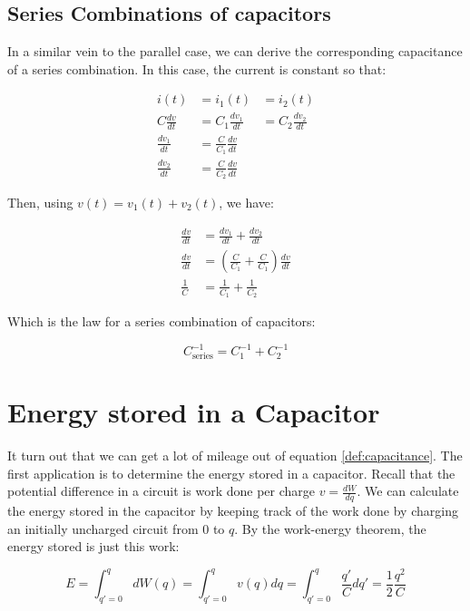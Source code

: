 \documentclass{tufte-book}
\begin{document}
\subsection{Series Combinations of capacitors}
In a similar vein to the parallel case, we can derive the corresponding capacitance of a series combination. In this case, the current is constant so that:

\begin{eqnarray*}
i(t)  &= i_1(t) &= i_2(t) \\
C\frac{dv}{dt}  &= C_1\frac{dv_1}{dt}             &= C_2\frac{dv_2}{dt} \\
\frac{dv_1}{dt} &= \frac{C}{C_1}\frac{dv}{dt}  & \\
\frac{dv_2}{dt} &= \frac{C}{C_2}\frac{dv}{dt}  &
\end{eqnarray*}

\noindent Then, using $v(t) = v_1(t) + v_2(t)$, we have:


\begin{align*}
\frac{dv}{dt} &= \frac{dv_1}{dt} + \frac{dv_2}{dt} \\
\frac{dv}{dt} &= \left(\frac{C}{C_1}+\frac{C}{C_1}\right)\frac{dv}{dt}\\
\frac{1}{C}&= \frac{1}{C_1} + \frac{1}{C_2}
\end{align*}

\noindent Which is the law for a series combination of capacitors:

\begin{equation}\label{eq:series_cap}
\boxed{C^{-1}_{\text{series}} = C^{-1}_1+C^{-1}_2}
\end{equation}


\section{Energy stored in a Capacitor}
It turn out that we can get a lot of mileage out of equation \ref{def:capacitance}. The first application is to determine the energy stored in a capacitor. Recall that the potential difference in a circuit is work done per charge $v = \frac{dW}{dq}$. We can calculate the energy stored in the capacitor by keeping track of the work done by charging an initially uncharged circuit from $0$ to $q$. By the work-energy theorem, the energy stored is just this work:

$$
E = \int_{q\prime=0}^{q} dW(q) =\int_{q\prime=0}^{q} v(q)dq = \int_{q\prime=0}^{q} \frac{q\prime}{C}dq\prime=\frac{1}{2}\frac{q^2}{C} 
$$
\end{document}
